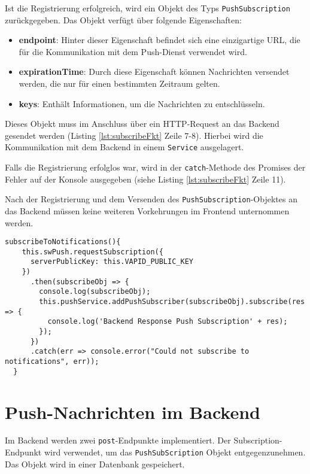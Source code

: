 Ist die Registrierung erfolgreich, wird ein Objekt des Typs \texttt{PushSubscription} zurückgegeben. 
Das Objekt verfügt über folgende Eigenschaften: 
\begin{itemize}
    \item \textbf{endpoint}: Hinter dieser Eigenschaft befindet sich eine einzigartige URL, die für die Kommunikation mit dem Push-Dienst verwendet wird. 
    \item \textbf{expirationTime}: Durch diese Eigenschaft können Nachrichten versendet werden, die nur für einen bestimmten Zeitraum gelten. 
    \item \textbf{keys}: Enthält Informationen, um die Nachrichten zu entschlüsseln. 
\end{itemize}
Dieses Objekt muss im Anschluss über ein HTTP-Request an das Backend gesendet werden (Listing \ref{lst:subscribeFkt} Zeile 7-8). Hierbei wird die Kommunikation mit dem Backend in einem \texttt{Service} ausgelagert. 

Falls die Registrierung erfolglos war, wird in der \texttt{catch}-Methode des Promises der Fehler auf der Konsole ausgegeben (siehe Listing \ref{lst:subscribeFkt} Zeile 11). 

Nach der Registrierung und dem Versenden des \texttt{PushSubscription}-Objektes an das Backend müssen keine weiteren Vorkehrungen im Frontend unternommen werden. 

\begin{lstlisting}[caption={Funktion zur Registrierung beim Push-Dienst},label = lst:subscribeFkt,  float=!htb]
subscribeToNotifications(){
    this.swPush.requestSubscription({
      serverPublicKey: this.VAPID_PUBLIC_KEY
    })
      .then(subscribeObj => {
        console.log(subscribeObj);
        this.pushService.addPushSubscriber(subscribeObj).subscribe(res => {
          console.log('Backend Response Push Subscription' + res);
        });
      })
      .catch(err => console.error("Could not subscribe to notifications", err));
  }
\end{lstlisting}

\newpage
\section{Push-Nachrichten im Backend}

Im Backend werden zwei \texttt{post}-Endpunkte implementiert. Der Subscription-Endpunkt wird verwendet, um das \texttt{PushSubScription} Objekt entgegenzunehmen. Das Objekt wird in einer Datenbank gespeichert. 

